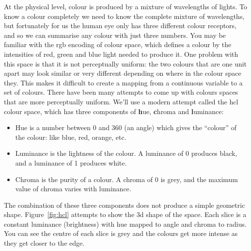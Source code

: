 At the physical level, colour is produced by a mixture of wavelengths of lights. To know a colour completely we need to know the complete mixture of wavelengths, but fortunately for us the human eye only has three different colour receptors, and so we can summarise any colour with just three numbers. You may be familiar with the rgb encoding of colour space, which defines a colour by the intensities of red, green and blue light needed to produce it. One problem with this space is that it is not perceptually uniform: the two colours that are one unit apart may look similar or very different depending on where in the colour space they. This makes it difficult to create a mapping from a continuous variable to a set of colours.  There have been many attempts to come up with colours spaces that are more perceptually uniform.  We'll use a modern attempt called the hcl colour space, which has three components of {\bf h}ue, {\bf c}hroma and {\bf l}uminance: 

\begin{itemize}
  \item Hue is a number between 0 and 360 (an angle) which gives the ``colour'' of the colour: like blue, red, orange, etc.
  \item Luminance is the lightness of the colour.  A luminance of 0 produces black, and a luminance of 1 produces white.
  \item Chroma is the purity of a colour.  A chroma of 0 is grey, and the maximum value of chroma varies with luminance.
\end{itemize} 

The combination of these three components does not produce a simple geometric shape.  Figure~\ref{fig:hcl} attempts to show the 3d shape of the space.  Each slice is a constant luminance (brightness) with hue mapped to angle and chroma to radius.  You can see the centre of each slice is grey and the colours get more intense as they get closer to the edge.

